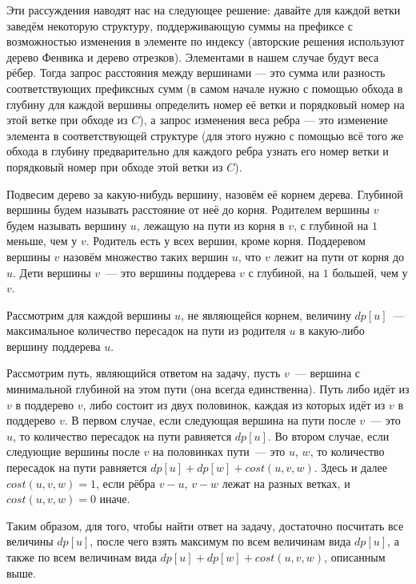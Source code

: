 \documentclass[12pt]{article}
\theoremstyle{definition}
\begin{document}
    Эти рассуждения наводят нас на следующее решение: давайте для каждой ветки заведём некоторую структуру, поддерживающую суммы на префиксе с возможностью изменения в элементе по индексу (авторские решения используют дерево Фенвика и дерево отрезков). Элементами в нашем случае будут веса рёбер. Тогда запрос расстояния между вершинами --- это сумма или разность соответствующих префиксных сумм (в самом начале нужно с помощью обхода в глубину для каждой вершины определить номер её ветки и  порядковый номер на этой ветке при обходе из $C$), а запрос изменения веса ребра --- это изменение элемента в соответствующей структуре (для этого нужно с помощью всё того же обхода в глубину предварительно для каждого ребра узнать его номер ветки и порядковый номер при обходе этой ветки из $C$).

\pagebreak


Подвесим дерево за какую-нибудь вершину, назовём её корнем дерева. Глубиной вершины будем называть расстояние от неё до корня. Родителем вершины $v$ будем называть вершину $u$, лежащую на пути из корня в $v$, с глубиной на $1$ меньше, чем у $v$. Родитель есть у всех вершин, кроме корня. Поддеревом вершины $v$ назовём множество таких вершин $u$, что $v$ лежит на пути от корня до $u$. Дети вершины $v$~--- это вершины поддерева $v$ с глубиной, на $1$ большей, чем у $v$.

Рассмотрим для каждой вершины $u$, не являющейся корнем, величину $dp[u]$~--- максимальное количество пересадок на пути из родителя $u$ в какую-либо вершину поддерева $u$.

Рассмотрим путь, являющийся ответом на задачу, пусть $v$~--- вершина с минимальной глубиной на этом пути (она всегда единственна). Путь либо идёт из $v$ в поддерево $v$, либо состоит из двух половинок, каждая из которых идёт из $v$ в поддерево $v$. В первом случае, если следующая вершина на пути после $v$~--- это $u$, то количество пересадок на пути равняется $dp[u]$. Во втором случае, если следующие вершины после $v$ на половинках пути~--- это $u$, $w$, то количество пересадок на пути равняется $dp[u]+dp[w]+cost(u,v,w)$. Здесь и далее $cost(u,v,w)=1$, если рёбра $v-u$, $v-w$ лежат на разных ветках, и $cost(u,v,w)=0$ иначе.

Таким образом, для того, чтобы найти ответ на задачу, достаточно посчитать все величины $dp[u]$, после чего взять максимум по всем величинам вида $dp[u]$, а также по всем величинам вида $dp[u]+dp[w]+cost(u,v,w)$, описанным выше.
\end{document}
